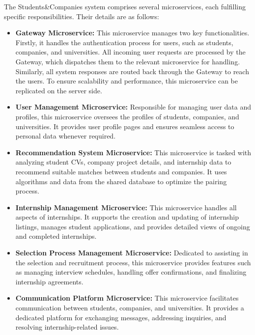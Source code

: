 The Students\&Companies system comprises several microservices, each fulfilling specific responsibilities. Their details are as follows:

\begin{itemize}
    \item \textbf{Gateway Microservice:} This microservice manages two key functionalities. Firstly, it handles the authentication process for users, such as students, companies, and universities. All incoming user requests are processed by the Gateway, which dispatches them to the relevant microservice for handling. Similarly, all system responses are routed back through the Gateway to reach the users. To ensure scalability and performance, this microservice can be replicated on the server side.

    \item \textbf{User Management Microservice:} Responsible for managing user data and profiles, this microservice oversees the profiles of students, companies, and universities. It provides user profile pages and ensures seamless access to personal data whenever required.

    \item \textbf{Recommendation System Microservice:} This microservice is tasked with analyzing student CVs, company project details, and internship data to recommend suitable matches between students and companies. It uses algorithms and data from the shared database to optimize the pairing process.

    \item \textbf{Internship Management Microservice:} This microservice handles all aspects of internships. It supports the creation and updating of internship listings, manages student applications, and provides detailed views of ongoing and completed internships.

    \item \textbf{Selection Process Management Microservice:} Dedicated to assisting in the selection and recruitment process, this microservice provides features such as managing interview schedules, handling offer confirmations, and finalizing internship agreements.

    \item \textbf{Communication Platform Microservice:} This microservice facilitates communication between students, companies, and universities. It provides a dedicated platform for exchanging messages, addressing inquiries, and resolving internship-related issues.


\end{itemize}
